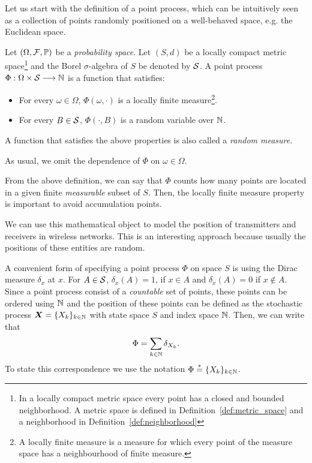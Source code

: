 Let us start with the definition of a point process, which can be intuitively seen as a collection of points randomly positioned on a well-behaved space, e.g. the Euclidean space.
%
\begin{definition}
    Let $(\Omega,\cal F, \P)$ be a \textit{probability space}. Let $(S,d)$ be a locally compact metric space\footnote{In a locally compact metric space every point has a closed and bounded neighborhood. A metric space is defined in Definition~\ref{def:metric_space} and a neighborhood in Definition~\ref{def:neighborhood}} and the Borel $\sigma$-algebra of $S$ be denoted by $\cal{S}$. A point process $\Phi:\Omega\times \cal S\longrightarrow \N$ is a function that satisfies:
    \begin{itemize}[noitemsep]
        \item For every $\omega\in\Omega$, $\Phi(\omega,\cdot)$ is a locally finite measure\footnote{A locally finite measure is a measure for which every point of the measure space has a neighbourhood of finite measure.}.
        \item For every $B\in\cal S$, $\Phi(\cdot,B)$ is a random variable over $\N$.
    \end{itemize}
    A function that satisfies the above properties is also called a \textit{random measure}.
    
    As usual, we omit the dependence of $\Phi$ on $\omega\in\Omega$.
\end{definition}
%
From the above definition, we can say that $\Phi$ counts how many points are located in a given finite \textit{measurable} subset of $S$.
%
Then, the locally finite measure property is important to avoid accumulation points.


We can use this mathematical object to model the position of transmitters and receivers in wireless networks.
%
This is an interesting approach because usually the positions of these entities are random.

\begin{remark} \label{rem:PP_set_notation}
    A convenient form of specifying a point process $\Phi$ on space $S$ is using the Dirac measure $\delta_x$ at $x$. For $A\in\cal S$, $\delta_x(A) = 1$, if $x\in A$ and $\delta_x(A) = 0$ if $x\notin A$.
    Since a point process consist of a \textit{countable} set of points, these points can be ordered using $\N$ and the position of these points can be defined as the stochastic process $\bm{X} = \{X_k\}_{k\in\N}$ with state space $S$ and index space $\N$. Then, we can write that
    \begin{align*}
        \Phi = \sum_{k\in\N} \delta_{X_k}.
    \end{align*}
    To state this correspondence we use the notation $\Phi \stackrel{*}{=} \{X_k\}_{k\in\N}$.
\end{remark}

